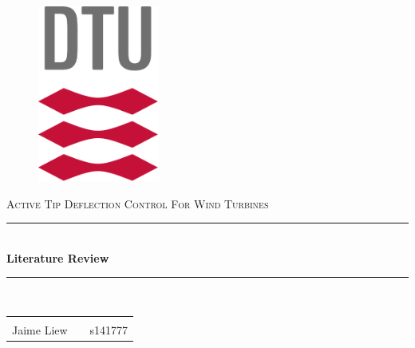\begin{titlepage}

\newcommand{\HRule}{\rule{\linewidth}{0.5mm}} %

\center %

\begin{figure}[H]
\centering
\includegraphics[width=40mm]{Figures/DTU_Logo.png}
\end{figure}
\vspace{3cm}
\textsc{\Large Active Tip Deflection Control For Wind Turbines}\\[0.5cm] 


\HRule \\[0.4cm]
{ \huge \bfseries Literature Review}\\[0.4cm] %
\HRule \\[1.5cm]



\begin{center}
\begin{tabular}{rll}
&\\
\large
Jaime Liew && s141777 \\


\end{tabular}
\end{center}
\end{titlepage}
